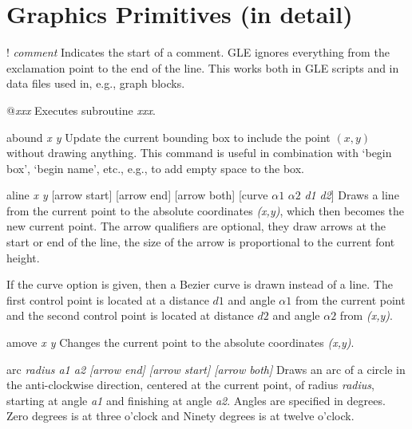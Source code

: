 \section{Graphics Primitives (in detail)}
\begin{commanddescription}

\item[{\sf ! {\it comment}}]
Indicates the start of a comment. GLE ignores everything from the exclamation point to the end of the line. This works both in GLE scripts and in data files used in, e.g., graph blocks.

\item[{\sf @{\it xxx}}] Executes subroutine {\it xxx}.

\item[{\sf abound {\it x y}}]
Update the current bounding box to include the point $(x,y)$ without drawing anything. This command is useful in combination with `begin box', `begin name', etc., e.g., to add empty space to the box.

\item[{\sf aline {\it x y}  [arrow start]  [arrow end] [arrow both]  [curve {\it $\alpha1$} {\it $\alpha2$} {\it d1} {\it d2}]}]
  Draws a line from
the current point to the absolute coordinates
{\it (x,y)}, which then becomes the new current point.  The arrow qualifiers
are optional, they draw arrows at the start or end of the line,  the size of
the arrow is proportional to the current font height.

If the curve option is given, then a Bezier curve is drawn instead of a line. The first control point is located at a distance $d1$ and angle $\alpha1$ from the current point and the second control point is located at distance $d2$ and angle $\alpha2$ from {\it (x,y)}.

\item[{\sf amove {\it x y}}]
 Changes the current point to the absolute coordinates
{\it (x,y)}.

\item[{\sf arc {\it radius a1 a2 [arrow end] [arrow start] [arrow both]}}]
 Draws an arc of a circle in the anti-clockwise direction, centered
at the current point, of radius {\it radius},
starting at angle {\it a1} and finishing at angle {\it a2}. Angles
are specified in degrees.  Zero degrees is at three o'clock and Ninety
degrees is at twelve o'clock.


\end{commanddescription}
